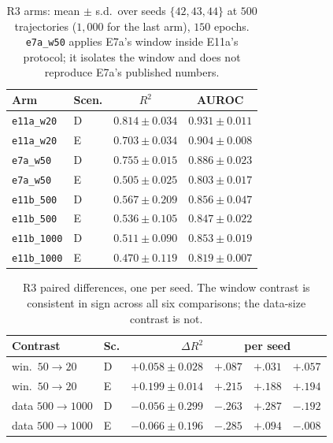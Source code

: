 \documentclass[twocolumn,10pt]{article}
\begin{document}
\begin{table}[h]
\centering
\caption{R3 arms: mean $\pm$ s.d.\ over seeds $\{42,43,44\}$ at
  $500$ trajectories ($1{,}000$ for the last arm), $150$ epochs.
  \texttt{e7a\_w50} applies E7a's window inside E11a's protocol; it
  isolates the window and does not reproduce E7a's published
  numbers.\label{tab:r3}}
\small
\begin{tabular}{llcc}
\toprule
Arm & Scen. & $R^2$ & AUROC \\
\midrule
\texttt{e11a\_w20}  & D & $0.814 \pm 0.034$ & $0.931 \pm 0.011$ \\
\texttt{e11a\_w20}  & E & $0.703 \pm 0.034$ & $0.904 \pm 0.008$ \\
\texttt{e7a\_w50}   & D & $0.755 \pm 0.015$ & $0.886 \pm 0.023$ \\
\texttt{e7a\_w50}   & E & $0.505 \pm 0.025$ & $0.803 \pm 0.017$ \\
\texttt{e11b\_500}  & D & $0.567 \pm 0.209$ & $0.856 \pm 0.047$ \\
\texttt{e11b\_500}  & E & $0.536 \pm 0.105$ & $0.847 \pm 0.022$ \\
\texttt{e11b\_1000} & D & $0.511 \pm 0.090$ & $0.853 \pm 0.019$ \\
\texttt{e11b\_1000} & E & $0.470 \pm 0.119$ & $0.819 \pm 0.007$ \\
\bottomrule
\end{tabular}
\end{table}

\begin{table}[h]
\centering
\caption{R3 paired differences, one per seed. The window contrast is
  consistent in sign across all six comparisons; the data-size contrast
  is not.\label{tab:r3d}}
\footnotesize
\setlength{\tabcolsep}{3pt}
\begin{tabular}{llrr@{\,}r@{\,}r}
\toprule
Contrast & Sc. & $\Delta R^2$ & \multicolumn{3}{c}{per seed} \\
\midrule
win.\ $50\!\to\!20$ & D & $+0.058 \pm 0.028$ & $+.087$ & $+.031$ & $+.057$ \\
win.\ $50\!\to\!20$ & E & $+0.199 \pm 0.014$ & $+.215$ & $+.188$ & $+.194$ \\
data $500\!\to\!1000$ & D & $-0.056 \pm 0.299$ & $-.263$ & $+.287$ & $-.192$ \\
data $500\!\to\!1000$ & E & $-0.066 \pm 0.196$ & $-.285$ & $+.094$ & $-.008$ \\
\bottomrule
\end{tabular}
\end{table}
\end{document}
